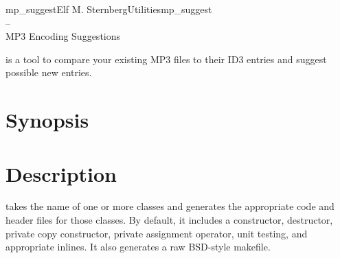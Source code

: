 \documentclass[english]{article}
\begin{document}
\begin{Name}{1}{mp\_suggest}{Elf M. Sternberg}{Utilities}{mp\_suggest \\--\\ MP3 Encoding Suggestions}

   is a tool to compare your existing MP3 files to
  their ID3 entries and suggest possible new entries.

\end{Name}

\section{Synopsis}

 

\section{Description}
 takes the name of one or more classes and generates the
  appropriate code and header files for those classes.  By default, it
  includes a constructor, destructor, private copy constructor, private
  assignment operator, unit testing, and appropriate inlines.  It also
  generates a raw BSD-style makefile.
\end{document}
